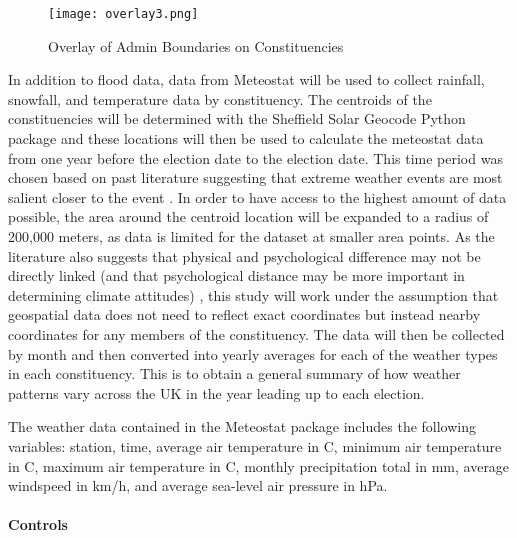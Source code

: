 \documentclass[12pt,letterpaper]{article}
\begin{document}
\begin{wrapfigure}[25]{l}{0.5\textwidth}
	\centering
	\texttt{[image: overlay3.png]}
	\caption{Overlay of Admin Boundaries on Constituencies}
	\label{fig:flood_overlay}
\end{wrapfigure}


In addition to flood data, data from Meteostat \autocite{MeteostatPyPI} will be used to collect rainfall, snowfall, and temperature data by constituency. The centroids of the constituencies will be determined with the Sheffield Solar Geocode Python package \autocite{GitHubSheffieldSolarGeocode} and these locations will then be used to calculate the meteostat data from one year before the election date to the election date. This time period was chosen based on past literature suggesting that extreme weather events are most salient closer to the event \autocite{viscontiEffectDifferentExtreme2024}. In order to have access to the highest amount of data possible, the area around the centroid location will be expanded to a radius of 200,000 meters, as data is limited for the dataset at smaller area points. As the literature also suggests that physical and psychological difference may not be directly linked (and that psychological distance may be more important in determining climate attitudes) \autocite{maiellaPsychologicalDistanceClimate2020}, this study will work under the assumption that geospatial data does not need to reflect exact coordinates but instead nearby coordinates for any members of the constituency. The data will then be collected by month and then converted into yearly averages for each of the weather types in each constituency. This is to obtain a general summary of how weather patterns vary across the UK in the year leading up to each election.

The weather data contained in the Meteostat package includes the following variables: station, time, average air temperature in C, minimum air temperature in C, maximum air temperature in C, monthly precipitation total in mm, average windspeed in km/h, and average sea-level air pressure in hPa.

\paragraph{Controls}
\end{document}
